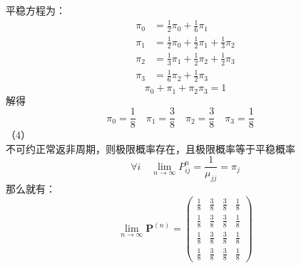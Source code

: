 \documentclass[UTF8,openany]{book}
\begin{document}
平稳方程为：
$$
\begin{aligned}
	\pi_0&=\frac{1}{2}\pi_0+\frac{1}{6}\pi_1\\
	\pi_1&=\frac{1}{2}\pi_0+\frac{1}{2}\pi_1+\frac{1}{3}\pi_2\\
	\pi_2&=\frac{1}{3}\pi_1+\frac{1}{2}\pi_2+\frac{1}{2}\pi_3\\
	\pi_3&=\frac{1}{6}\pi_2+\frac{1}{2}\pi_3
\end{aligned}
$$
\[
\pi_0+\pi_1+\pi_2\pi_3=1
\]
解得
\[
\pi_0=\frac{1}{8} \quad \pi_1=\frac{3}{8} \quad \pi_2=\frac{3}{8} \quad \pi_3=\frac{1}{8} \quad
\]
（4）\\
不可约正常返非周期，则极限概率存在，且极限概率等于平稳概率\\
\[
\forall i \quad \lim_{n\rightarrow \infty} P_{ij}^n=\frac{1}{\mu_{jj}}=\pi_j
\]
那么就有：
\[
\lim _{n \rightarrow \infty} \mathbf{P}^{(n)}=
\begin{pmatrix}
	\frac{1}{8} &\frac{3}{8}&\frac{3}{8}&\frac{1}{8}\\
	\frac{1}{8} &\frac{3}{8}&\frac{3}{8}&\frac{1}{8}\\
	\frac{1}{8} &\frac{3}{8}&\frac{3}{8}&\frac{1}{8}\\
	\frac{1}{8} &\frac{3}{8}&\frac{3}{8}&\frac{1}{8}
\end{pmatrix}
\]\\
\end{document}
